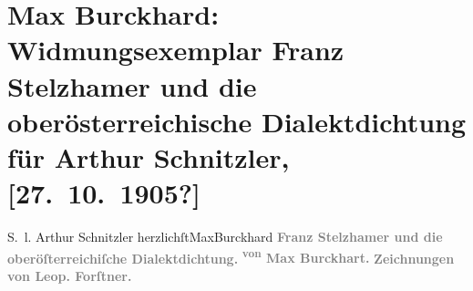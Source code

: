 

         
         \newcommand{\erwaehntePersonen}{Personen: Leopold Forstner}
         \newcommand{\erwaehnteInstitutionen}{Institutionen: Wiener Verlag}
         \newcommand{\erwaehnteOrte}{Orte: Leipzig, Wien}
         \newcommand{\erwaehnteWerke}{Werke: Börsenblatt für den deutschen Buchhandel, Charakterbilder aus Oberösterreich, Franz Stelzhamer und die oberösterreichische Dialektdichtung}
               \section[Max Burckhard: Widmungsexemplar Franz Stelzhamer und die oberösterreichische Dialektdichtung für Arthur Schnitzler, {[}27. 10. 1905?{]}]{ Max Burckhard: Widmungsexemplar Franz Stelzhamer und die
                    oberösterreichische Dialektdichtung für Arthur Schnitzler, {[}27. 10. 1905?{]}}\nopagebreak{}\rehead{ }\begin{ledgroupsized}[t]{13cm}\normalsize\beginnumbering \toendnotes[C]{\smallbreak\pagebreak[2]} 
\toendnotes[C]{\smallbreak}\pstart
           \noindent{}{\pb}S. l. Arthur Schnitzler\pend
           \pstart herzlichſt\spacefill\mbox{MaxBurckhard}\pend{}{\bigskip}\pstart
           \noindent{}\centering{}{\pb}\textcolor{gray}{\textbf{Franz Stelzhamer und die oberöſterreichiſche
                            Dialektdichtung.}}\pend
           \pstart
           \noindent{}\centering{}\textcolor{gray}{\textbf{\textsuperscript{von} Max Burckhart.}}\pend
           \pstart
           \noindent{}\centering{}\textcolor{gray}{\textbf{Zeichnungen von Leop.
                            Forſtner.}}\pend
           {\bigskip}\pstart
           \noindent{}\centering{}\textcolor{gray}{\textbf{\label{K_L01566_1v}}}
\end{ledgroupsized}
